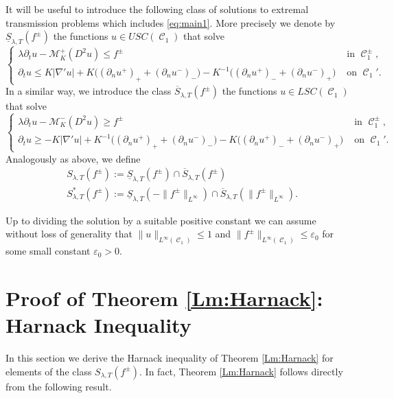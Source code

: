 \documentclass[12pt]{article}
\numberwithin{Theorem}{section}
\theoremstyle{definition}
\theoremstyle{remark}
\numberwithin{equation}{section}
\DeclareMathOperator{\C}{\mathcal{C}}
\newcommand{\p}{\partial}
\begin{document}
It will be useful to introduce the following class of solutions to extremal transmission problems which includes \eqref{eq:main1}. More precisely we denote by $\underline{S}_{\lambda,T}(f^{\pm})$ the functions $u \in USC(\C_1)$ that solve
\begin{equation} \label{eq:subsol}
    \begin{cases}
        \lambda \p_t u - \mathcal M_K^+ (D^2 u) \leq f^\pm  & \text{ in } \C_1^{\pm}, \\ 
          \p_t u \leq K |\nabla' u| + K\big( (\p_n u^+)_+ + (\p_n u^-)_- \big) - K^{-1}\big( (\p_n u^+)_- + (\p_n u^-)_+ \big) & \text{ on }\C_{1}'.
    \end{cases}
\end{equation}
In a similar way, we introduce the class $\overline{S}_{\lambda,T}(f^{\pm})$ the functions $u \in LSC(\C_1)$ that solve
\begin{equation} \label{eq:supersol}
    \begin{cases}
        \lambda \p_t u - \mathcal M_K^- (D^2 u) \geq f^\pm  & \text{ in } \C_1^{\pm}, \\ 
          \p_t u \geq  -K |\nabla' u| + K^{-1}\big( (\p_n u^+)_+ + (\p_n u^-)_- \big) - K\big( (\p_n u^+)_- + (\p_n u^-)_+ \big)& \text{ on }\C_{1}'.
    \end{cases}
\end{equation}
Analogously as above, we define
\begin{align*}
    &S_{\lambda,T}(f^{\pm}):=  \underline{S}_{\lambda,T}(f^{\pm})  \cap  \overline{S}_{\lambda,T}(f^{\pm})\\
    &S^*_{\lambda,T}(f^{\pm}):=\underline{S}_{\lambda,T}(-\|f^{\pm}\|_{L^{\infty}})  \cap \overline{S}_{\lambda,T}(\|f^{\pm}\|_{L^{\infty}}).
\end{align*}

Up to dividing the solution by a suitable positive constant 
we can assume without loss of generality that $\|u\|_{L^\infty(\C_1)} \leq 1$ and $\|f^\pm\|_{L^\infty(\C_1)} \leq \varepsilon_0$ for some small constant $\varepsilon_0 > 0$.




\section{Proof of Theorem \ref{Lm:Harnack}: Harnack Inequality} \label{sec:harnack}
In this section we derive the Harnack inequality of Theorem \ref{Lm:Harnack} for elements of the class $S_{\lambda,T}(f^{\pm})$. In fact, Theorem \ref{Lm:Harnack} follows directly from the following result. 
\end{document}
